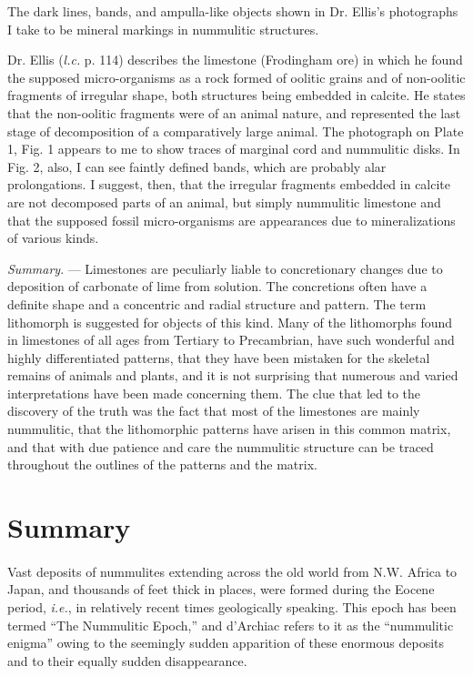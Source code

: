 \documentclass[a4paper, 12pt, oneside, landscape]{article}
\begin{document}
The dark lines, bands, and ampulla-like objects shown in Dr. Ellis's photographs I take to be mineral markings in nummulitic structures.

Dr. Ellis (\emph{l.c.} p. 114) describes the limestone (Frodingham ore) in which he found the supposed micro-organisms as a rock formed of oolitic grains and of non-oolitic fragments of irregular shape, both structures being embedded in calcite. He states that the non-oolitic fragments were of an animal nature, and represented the last stage of decomposition of a comparatively large animal. The photograph on Plate 1, Fig. 1 appears to me to show traces of marginal cord and nummulitic disks. In Fig. 2, also, I can see faintly defined bands, which are probably alar prolongations. I suggest, then, that the irregular fragments embedded in calcite are not decomposed parts of an animal, but simply nummulitic limestone and that the supposed fossil micro-organisms are appearances due to mineralizations of various kinds.

\emph{Summary}. --- Limestones are peculiarly liable to concretionary changes due to deposition of carbonate of lime from solution. The concretions often have a definite shape and a concentric and radial structure and pattern. The term lithomorph is suggested for objects of this kind. Many of the lithomorphs found in limestones of all ages from Tertiary to Precambrian, have such wonderful and highly differentiated patterns, that they have been mistaken for the skeletal remains of animals and plants, and it is not surprising that numerous and varied interpretations have been made concerning them. The clue that led to the discovery of the truth was the fact that most of the limestones are mainly nummulitic, that the lithomorphic patterns have arisen in this common matrix, and that with due patience and care the nummulitic structure can be traced throughout the outlines of the patterns and the matrix.
\clearpage
\section{Summary}
\paragraph{}
Vast deposits of nummulites extending across the old world from N.W. Africa to Japan, and thousands of feet thick in places, were formed during the Eocene period, \emph{i.e.}, in relatively recent times geologically speaking. This epoch has been termed ``The Nummulitic Epoch,'' and d'Archiac refers to it as the ``nummulitic enigma'' owing to the seemingly sudden apparition of these enormous deposits and to their equally sudden disappearance.
\end{document}
